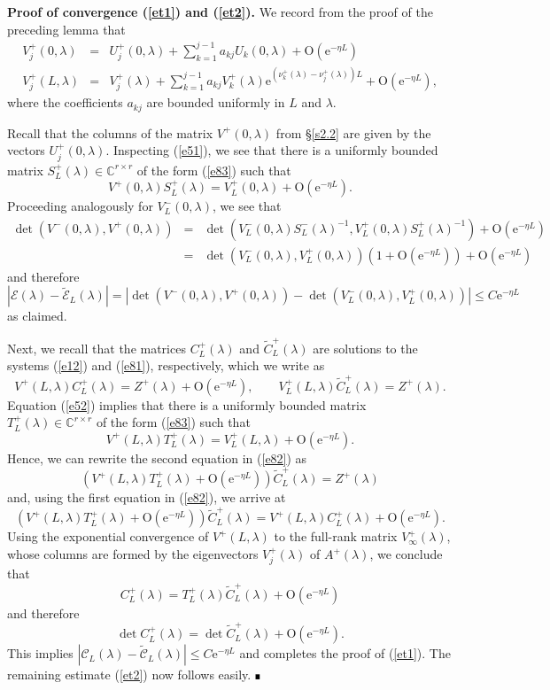 \documentclass[10pt]{article}
\newenvironment{Proof}[1][.]%
 {\begin{trivlist}\item[]\textbf{Proof#1 }}%
 {\hspace*{\fill}$\rule{0.3\baselineskip}{0.35\baselineskip}$\end{trivlist}}
\numberwithin{equation}{section}
\newcommand{\C}{\mathbb{C}}
\newcommand{\rme}{\mathrm{e}}
\newcommand{\rmO}{\mathrm{O}}
\begin{document}
\begin{Proof}[ of convergence (\ref{et1}) and (\ref{et2}).]
We record from the proof of the preceding lemma that
\begin{eqnarray}
V^+_j(0,\lambda) & = & U^+_j(0,\lambda) + \sum_{k=1}^{j-1} a_{kj} U_k(0,\lambda) + \rmO(\rme^{-\eta L})
\label{e51} \\ \label{e52}
V^+_j(L,\lambda) & = & V^+_j(\lambda) + \sum_{k=1}^{j-1} a_{kj} V^+_k(\lambda) \rme^{(\nu^+_k(\lambda)-\nu^+_j(\lambda))L} + \rmO(\rme^{-\eta L}),
\end{eqnarray}
where the coefficients $a_{kj}$ are bounded uniformly in $L$ and $\lambda$.

Recall that the columns of the matrix $V^+(0,\lambda)$ from \S\ref{s2.2} are given by the vectors $U^+_j(0,\lambda)$. Inspecting (\ref{e51}), we see that there is a uniformly bounded matrix $S^+_L(\lambda)\in\C^{r\times r}$ of the form (\ref{e83}) such that 
\[
V^+(0,\lambda) S^+_L(\lambda) = V^+_L(0,\lambda) + \rmO(\rme^{-\eta L}).
\]
Proceeding analogously for $V^-_L(0,\lambda)$, we see that
\begin{eqnarray*}
\det(V^-(0,\lambda),V^+(0,\lambda)) & = & 
\det(V^-_L(0,\lambda) S^-_L(\lambda)^{-1},V^+_L(0,\lambda)S^+_L(\lambda)^{-1}) + \rmO(\rme^{-\eta L}) \\ & = &
\det(V^-_L(0,\lambda),V^+_L(0,\lambda)) (1+\rmO(\rme^{-\eta L})) + \rmO(\rme^{-\eta L})
\end{eqnarray*}
and therefore
\[
|\mathcal{E}(\lambda) - \tilde{\mathcal{E}}_L(\lambda)|
= |\det(V^-(0,\lambda),V^+(0,\lambda)) - \det(V^-_L(0,\lambda),V^+_L(0,\lambda))|
\leq C \rme^{-\eta L}
\]
as claimed.

Next, we recall that the matrices $C^+_L(\lambda)$ and $\tilde{C}^+_L(\lambda)$ are solutions to the systems (\ref{e12}) and (\ref{e81}), respectively, which we write as
\begin{equation}\label{e82}
V^+(L,\lambda) C^+_L(\lambda) = Z^+(\lambda) + \rmO(\rme^{-\eta L}), \qquad
V^+_L(L,\lambda) \tilde{C}^+_L(\lambda) = Z^+(\lambda).
\end{equation}
Equation (\ref{e52}) implies that there is a uniformly bounded matrix $T^+_L(\lambda)\in\C^{r\times r}$ of the form (\ref{e83}) such that
\[
V^+(L,\lambda) T^+_L(\lambda) = V^+_L(L,\lambda) + \rmO(\rme^{-\eta L}).
\]
Hence, we can rewrite the second equation in (\ref{e82}) as
\[
(V^+(L,\lambda) T^+_L(\lambda) + \rmO(\rme^{-\eta L})) \tilde{C}^+_L(\lambda) = Z^+(\lambda) 
\]
and, using the first equation in (\ref{e82}), we arrive at
\[
(V^+(L,\lambda) T^+_L(\lambda) + \rmO(\rme^{-\eta L})) \tilde{C}^+_L(\lambda) = 
V^+(L,\lambda) C^+_L(\lambda) + \rmO(\rme^{-\eta L}).
\]
Using the exponential convergence of $V^+(L,\lambda)$ to the full-rank matrix $V^+_\infty(\lambda)$, whose columns are formed by the eigenvectors $V^+_j(\lambda)$ of $A^+(\lambda)$, we conclude that
\[
C^+_L(\lambda) = T^+_L(\lambda) \tilde{C}^+_L(\lambda) + \rmO(\rme^{-\eta L})
\]
and therefore
\[
\det C^+_L(\lambda) = \det \tilde{C}^+_L(\lambda) + \rmO(\rme^{-\eta L}).
\]
This implies $|\mathcal{C}_L(\lambda)-\tilde{\mathcal{C}}_L(\lambda)|\leq C\rme^{-\eta L}$ and completes the proof of (\ref{et1}). The remaining estimate (\ref{et2}) now follows easily.
\end{Proof}
\end{document}
